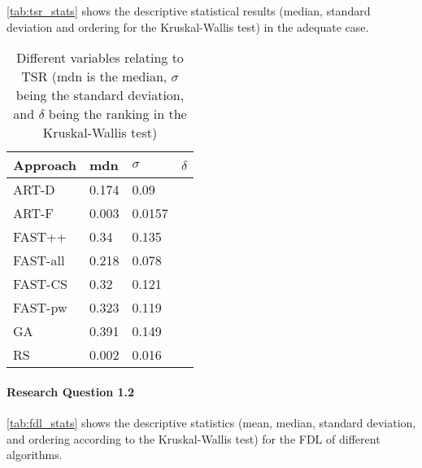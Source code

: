 \autoref{tab:tsr_stats} shows the descriptive statistical results
(median, standard deviation and ordering for the Kruskal-Wallis test)
in the adequate case.

\begin{table}[htpb]
	\caption[TSR statistical results, adequate]{Different variables relating to TSR (mdn is the median, $\sigma$ being the standard deviation, and $\delta$ being the ranking in the Kruskal-Wallis test)}\label{tab:tsr_stats}
	\centering
	\begin{tabular}{l l l l}
	Approach & mdn & $\sigma$ & $\delta$ \\
	\midrule
	ART-D & 0.174 & 0.09 & \\
	ART-F & 0.003 & 0.0157 & \\
	FAST++ & 0.34 & 0.135 & \\
	FAST-all & 0.218 & 0.078 & \\
	FAST-CS & 0.32 & 0.121 & \\
	FAST-pw & 0.323 & 0.119 & \\
	GA & 0.391 & 0.149 & \\
	RS & 0.002 & 0.016 & \\
	\bottomrule
	\end{tabular}
\end{table}

\paragraph{Research Question 1.2}

\autoref{tab:fdl_stats} shows the descriptive statistics (mean, median,
standard deviation, and ordering according to the Kruskal-Wallis test)
for the FDL of different algorithms.


